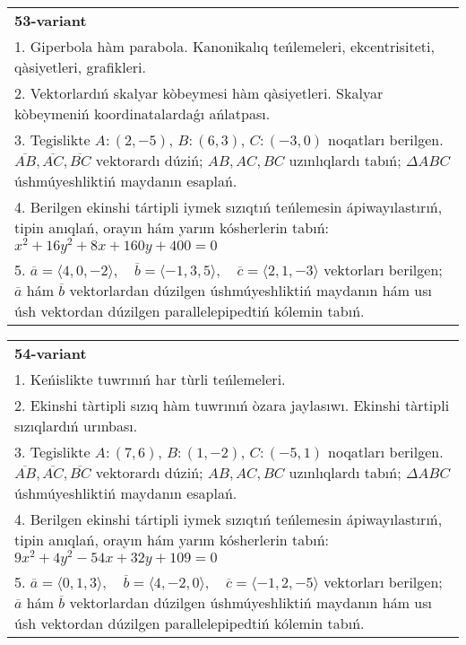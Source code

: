\documentclass{article}
\begin{document}
\begin{tabular}{m{17cm}}
\textbf{53-variant}\\
1. Giperbola hàm parabola. Kanonikalıq teńlemeleri, ekcentrisiteti, qàsiyetleri, grafikleri.\\

2. Vektorlardıń skalyar kòbeymesi hàm qàsiyetleri. Skalyar kòbeymeniń koordinatalardaǵı ańlatpası.\\

3. Tegislikte $A: (2, -5)$, $B: (6, 3)$, $C: (-3, 0)$ noqatları berilgen. $\overline{AB}, \overline{AC}, \overline{BC}$ vektorardı dúziń; $AB, AC, BC$ uzınlıqlardı tabıń; $\Delta ABC$ úshmúyeshliktiń maydanın esaplań. \\

4. Berilgen ekinshi tártipli iymek sızıqtıń teńlemesin ápiwayılastırıń, tipin anıqlań, orayın hám yarım kósherlerin tabıń: $x^2+16y^2+8x+160y+400=0$\\

5. \(\overline{a} = \langle 4, 0, -2 \rangle, \quad \overline{b} = \langle -1, 3, 5 \rangle, \quad \overline{c} = \langle 2, 1, -3 \rangle\) vektorları berilgen; \(\overline{a}\) hám \(\overline{b}\) vektorlardan dúzilgen úshmúyeshliktiń maydanın hám usı úsh vektordan dúzilgen parallelepipedtiń kólemin tabıń.
\end{tabular}
\vspace{1cm}


\begin{tabular}{m{17cm}}
\textbf{54-variant}\\
1. Keńislikte tuwrınıń har tùrli teńlemeleri. \\

2. Ekinshi tàrtipli sızıq hàm tuwrınıń òzara jaylasıwı. Ekinshi tàrtipli sızıqlardıń urınbası.\\

3. Tegislikte $A: (7, 6)$, $B: (1, -2)$, $C: (-5, 1)$ noqatları berilgen. $\overline{AB}, \overline{AC}, \overline{BC}$ vektorardı dúziń; $AB, AC, BC$ uzınlıqlardı tabıń; $\Delta ABC$ úshmúyeshliktiń maydanın esaplań. \\

4. Berilgen ekinshi tártipli iymek sızıqtıń teńlemesin ápiwayılastırıń, tipin anıqlań, orayın hám yarım kósherlerin tabıń: $9x^2+4y^2-54x+32y+109=0$\\

5. \(\overline{a} = \langle 0, 1, 3 \rangle, \quad \overline{b} = \langle 4, -2, 0 \rangle, \quad \overline{c} = \langle -1, 2, -5 \rangle\) vektorları berilgen; \(\overline{a}\) hám \(\overline{b}\) vektorlardan dúzilgen úshmúyeshliktiń maydanın hám usı úsh vektordan dúzilgen parallelepipedtiń kólemin tabıń.
\end{tabular}
\vspace{1cm}
\end{document}
